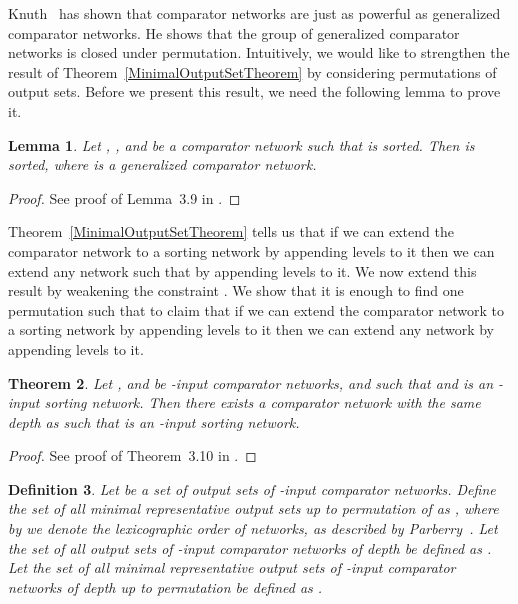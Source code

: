 \documentclass[13pt,a4paper]{article}
\newtheorem{theorem}{Theorem}[section]
\newtheorem{lemma}[theorem]{Lemma}
\newtheorem{definition}[theorem]{Definition}
\begin{document}
Knuth~\cite{Knuth73} has shown that comparator networks are just as powerful as generalized comparator networks. He shows that the group of generalized comparator networks is closed under permutation. Intuitively, we would like to strengthen the result of Theorem~\ref{MinimalOutputSetTheorem} by considering permutations of output sets. Before we present this result, we need the following lemma to prove it.

\begin{lemma}
\label{lemma:PermutationSet}
Let , , and  be a comparator network such that  is sorted. Then  is sorted, where  is a generalized comparator network.
\end{lemma}

\begin{proof}
See proof of Lemma~3.9 in \cite{Marinov:SortingNetworks:ThirdLevel}.
\end{proof}

Theorem~\ref{MinimalOutputSetTheorem} tells us that if we can extend the comparator network  to a sorting network by appending  levels to it then we can extend any network  such that  by appending  levels to it. We now extend this result by weakening the constraint . We show that it is enough to find one permutation  such that  to claim that if we can extend the comparator network  to a sorting network by appending  levels to it then we can extend any network  by appending  levels to it.

\begin{theorem}
\label{MinimalPermutationOutputSetTheorem}
Let ,  and  be -input comparator networks, and  such that  and  is an -input sorting network. Then there exists a comparator network  with the same depth as  such that  is an -input sorting network.
\end{theorem}

\begin{proof}
See proof of Theorem~3.10 in \cite{Marinov:SortingNetworks:ThirdLevel}.
\end{proof}


\begin{definition}
\label{def:min_pi}
Let  be a set of output sets of -input comparator networks. Define the set of all minimal representative output sets up to permutation of  as , where by  we denote the lexicographic order of networks, as described by Parberry~\cite{Parberry89}. Let the set of all output sets of -input comparator networks of depth  be defined as . Let the set of all minimal representative output sets of -input comparator networks of depth  up to permutation be defined as .
\end{definition}
\end{document}

